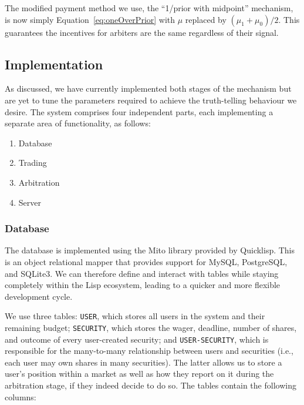 \documentclass[10pt,a4paper]{article}
\theoremstyle{plain}
\theoremstyle{definition}
\newcommand{\code}[1]{\texttt{#1}}
\begin{document}
The modified payment method we use, the ``1/prior with midpoint'' mechanism, is
now simply Equation~\ref{eq:oneOverPrior} with $\mu$ replaced by $(\mu_1 +
\mu_0)/2$. This guarantees the incentives for arbiters are the same regardless
of their signal.

\subsection{Implementation}

As discussed, we have currently implemented both stages of the mechanism but
are yet to tune the parameters required to achieve the truth-telling behaviour
we desire. The system comprises four independent parts, each implementing a
separate area of functionality, as follows:

\begin{enumerate}
	\itemsep0em
	\item Database
	\item Trading
	\item Arbitration
	\item Server
\end{enumerate}

\subsubsection{Database}

The database is implemented using the Mito library provided by Quicklisp. This
is an object relational mapper that provides support for MySQL, PostgreSQL, and
SQLite3. We can therefore define and interact with tables while staying
completely within the Lisp ecosystem, leading to a quicker and more flexible
development cycle.

We use three tables: \code{USER}, which stores all users in the system and
their remaining budget; \code{SECURITY}, which stores the wager, deadline,
number of shares, and outcome of every user-created security; and
\code{USER-SECURITY}, which is responsible for the many-to-many relationship
between users and securities (i.e., each user may own shares in many
securities). The latter allows us to store a user's position within a market as
well as how they report on it during the arbitration stage, if they indeed
decide to do so. The tables contain the following columns:
\end{document}
